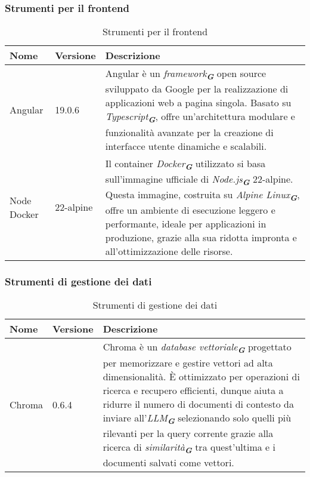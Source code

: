 \subsubsection{Strumenti per il frontend}
\label{subsec:strumenti_frontend}
\begin{table}[h!]
    \centering
    \renewcommand{\arraystretch}{1.6} %
    \begin{tabularx}{\textwidth}{|p{2cm}|p{2cm}|X|} \hline
    \rowcolor[HTML]{FFD700} 
    \textbf{Nome} & \textbf{Versione} & \textbf{Descrizione} \\ \hline
    Angular & 19.0.6 & Angular è un \emph{framework}\textsubscript{\textbf{\textit{G}}} open source sviluppato da Google per la realizzazione di applicazioni web a pagina singola. 
    Basato su \emph{Typescript}\textsubscript{\textbf{\textit{G}}}, offre un'architettura modulare e funzionalità avanzate per la creazione di interfacce utente dinamiche e scalabili. \\ \hline
    Node Docker & 22-alpine & Il container \emph{Docker}\textsubscript{\textbf{\textit{G}}} utilizzato si basa sull'immagine ufficiale di \emph{Node.js}\textsubscript{\textbf{\textit{G}}} 22-alpine. 
    Questa immagine, costruita su \emph{Alpine Linux}\textsubscript{\textbf{\textit{G}}}, offre un ambiente di esecuzione leggero e performante, ideale per applicazioni in produzione, 
    grazie alla sua ridotta impronta e all'ottimizzazione delle risorse. \\ \hline
    \end{tabularx}
    \caption{Strumenti per il frontend}
\end{table}

\subsubsection{Strumenti di gestione dei dati}
\label{subsec:strumenti_gestione_dati}

\begin{table}[h!]
    \centering
    \renewcommand{\arraystretch}{1.6} %
    \begin{tabularx}{\textwidth}{|p{2cm}|p{2cm}|X|} \hline
    \rowcolor[HTML]{FFD700} 
    \textbf{Nome} & \textbf{Versione} & \textbf{Descrizione} \\ 
    \hline
    Chroma & 0.6.4 & Chroma è un \emph{database vettoriale}\textsubscript{\textbf{\textit{G}}} progettato per memorizzare e
                    gestire vettori ad alta dimensionalità. 
                    È ottimizzato per operazioni di ricerca e recupero efficienti, dunque aiuta a ridurre il numero di documenti
                    di contesto da inviare all'\emph{LLM}\textsubscript{\textbf{\textit{G}}} selezionando solo quelli più rilevanti
                    per la query corrente grazie alla ricerca di \emph{similarità}\textsubscript{\textbf{\textit{G}}} tra 
                    quest'ultima e i documenti salvati come vettori. \\ \hline
    \end{tabularx}
    \caption{Strumenti di gestione dei dati}
\end{table}

